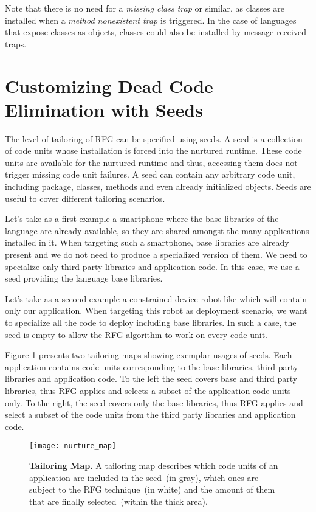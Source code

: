 Note that there is no need for a \emph{missing class trap} or similar, as classes are installed when a \emph{method nonexistent trap} is triggered. In the case of languages that expose classes as objects, classes could also be installed by message received traps.


\section{Customizing Dead Code Elimination with Seeds}\label{sec:seeds}

The level of tailoring of RFG can be specified using seeds. A seed is a collection of code units whose installation is forced into the nurtured runtime. These code units are available for the nurtured runtime and thus, accessing them does not trigger missing code unit failures. A seed can contain any arbitrary code unit, including package, classes, methods and even already initialized objects. Seeds are useful to cover different tailoring scenarios.

Let's take as a first example a smartphone where the base libraries of the language are already available, so they are shared amongst the many applications installed in it. When targeting such a smartphone, base libraries are already present and we do not need to produce a specialized version of them. We need to specialize only third-party libraries and application code. In this case, we use a seed providing the language base libraries.

Let's take as a second example a constrained device robot-like which will contain only our application. When targeting this robot as deployment scenario, we want to specialize all the code to deploy including base libraries. In such a case, the seed is empty to allow the RFG algorithm to work on every code unit.

Figure \ref{fig:nurturing_map_model} presents two tailoring maps showing exemplar usages of seeds. Each application contains code units corresponding to the base libraries, third-party libraries and application code. To the left the seed covers base and third party libraries, thus RFG applies and selects a subset of the application code units only. To the right, the seed covers only the base libraries, thus RFG applies and select a subset of the code units from the third party libraries and application code.

\begin{figure}[ht]
\begin{center}
\texttt{[image: nurture\_map]}
\caption{\textbf{Tailoring Map.} A tailoring map describes which code units of an application are included in the seed~(in gray), which ones are subject to the RFG technique~(in white) and the amount of them that are finally selected~(within the thick area).
\label{fig:nurturing_map_model}}
\end{center}
\end{figure}


